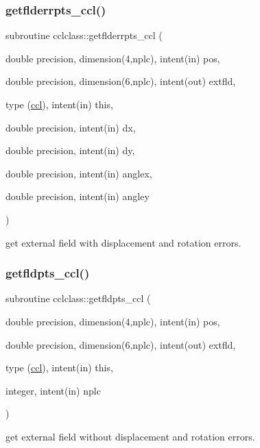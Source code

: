 \subsubsection{\texorpdfstring{getflderrpts\_ccl()}{getflderrpts\_ccl()}}
{\footnotesize\ttfamily subroutine cclclass\+::getflderrpts\+\_\+ccl (\begin{DoxyParamCaption}\item[{double precision, dimension(4,nplc), intent(in)}]{pos,  }\item[{double precision, dimension(6,nplc), intent(out)}]{extfld,  }\item[{type (\mbox{\hyperlink{namespacecclclass_structcclclass_1_1ccl}{ccl}}), intent(in)}]{this,  }\item[{double precision, intent(in)}]{dx,  }\item[{double precision, intent(in)}]{dy,  }\item[{double precision, intent(in)}]{anglex,  }\item[{double precision, intent(in)}]{angley }\end{DoxyParamCaption})}



get external field with displacement and rotation errors. 

\mbox{\label{namespacecclclass_aa98c971191ca605d023e7c03c447566a}} 
\subsubsection{\texorpdfstring{getfldpts\_ccl()}{getfldpts\_ccl()}}
{\footnotesize\ttfamily subroutine cclclass\+::getfldpts\+\_\+ccl (\begin{DoxyParamCaption}\item[{double precision, dimension(4,nplc), intent(in)}]{pos,  }\item[{double precision, dimension(6,nplc), intent(out)}]{extfld,  }\item[{type (\mbox{\hyperlink{namespacecclclass_structcclclass_1_1ccl}{ccl}}), intent(in)}]{this,  }\item[{integer, intent(in)}]{nplc }\end{DoxyParamCaption})}



get external field without displacement and rotation errors. 

